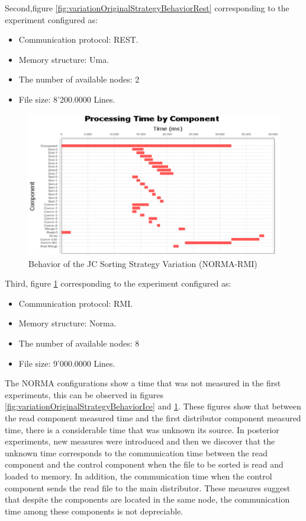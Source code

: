 Second,figure \ref{fig:variationOriginalStrategyBehaviorRest} corresponding to the experiment configured as: 
\begin{itemize}
	\item Communication protocol: REST.
	\item  Memory structure: Uma.
	\item The number of available nodes: 2
	\item File size: 8'200.0000 Lines.
\end{itemize}

\begin{figure}[H]
	\centering
	\includegraphics[trim=0.5cm 17cm -5cm 1cm, scale=0.9]{fig/MSNormaRmi890Behavior.eps}
	\caption{Behavior of the JC Sorting Strategy Variation (NORMA-RMI)}
	\label{fig:variationOriginalStrategyBehaviorRmi}
\end{figure}

Third, figure \ref{fig:variationOriginalStrategyBehaviorRmi} corresponding to the experiment configured as: 
\begin{itemize}
	\item Communication protocol: RMI.
	\item  Memory structure: Norma.
	\item The number of available nodes: 8
	\item File size: 9'000.0000 Lines.
\end{itemize}


The NORMA configurations show a time that was not measured in the first experiments, this can be observed in figures \ref{fig:variationOriginalStrategyBehaviorIce} and \ref{fig:variationOriginalStrategyBehaviorRmi}. These figures show that between the read component measured time and the first distributor component measured time, there is a considerable time that was unknown its source. In posterior experiments, new measures were introduced and then we discover that the unknown time corresponds to the communication time between the read component and the control component when the file to be sorted is read and loaded to memory. In addition, the communication time when the control component sends the read file to the main distributor. These measures suggest that despite the components are located in the same node, the communication time among these components is not depreciable.

